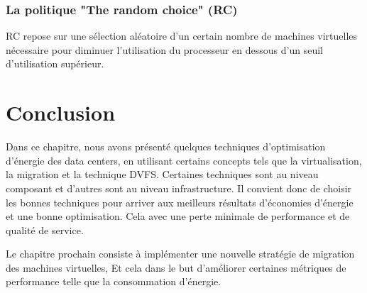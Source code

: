 \begin{onehalfspace}
\subsubsection{La politique "The random choice" (RC)}

RC repose sur une sélection aléatoire d'un certain nombre de machines virtuelles nécessaire pour diminuer l'utilisation du processeur  en dessous d'un seuil d'utilisation supérieur.

\end{onehalfspace}
\clearpage
\section{Conclusion}
\begin{onehalfspace}
Dans ce chapitre, nous avons présenté quelques techniques d'optimisation d'énergie des data centers, en utilisant certains concepts tels que la virtualisation, la migration et la technique DVFS. Certaines techniques sont au niveau composant et d'autres sont au niveau infrastructure. Il convient donc de choisir les bonnes techniques pour arriver aux meilleurs résultats d'économies d'énergie et une bonne optimisation. Cela avec une perte minimale de performance et de qualité de service.

Le chapitre prochain consiste à implémenter une nouvelle stratégie de migration des machines virtuelles, Et cela dans le but d'améliorer certaines métriques de performance telle que la consommation d'énergie.
\end{onehalfspace}